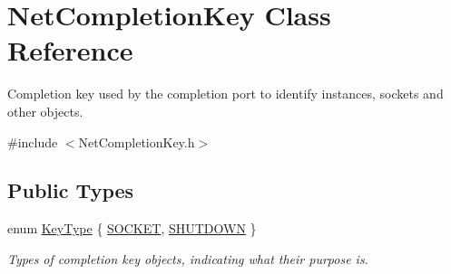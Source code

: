 \hypertarget{class_net_completion_key}{
\section{NetCompletionKey Class Reference}
\label{class_net_completion_key}
}


Completion key used by the completion port to identify instances, sockets and other objects.  




{\ttfamily \#include $<$NetCompletionKey.h$>$}

\subsection*{Public Types}
\begin{DoxyCompactItemize}
\item 
enum \hyperlink{class_net_completion_key_a129b5d89d5f2ac58abcc9872adc85d32}{KeyType} \{ \hyperlink{class_net_completion_key_a129b5d89d5f2ac58abcc9872adc85d32aa5938cb8a68c873ecec66e4440597891}{SOCKET}, 
\hyperlink{class_net_completion_key_a129b5d89d5f2ac58abcc9872adc85d32a6de0ac39e69b38d1e5b3d89f14168992}{SHUTDOWN}
 \}
\begin{DoxyCompactList}\small\item\em Types of completion key objects, indicating what their purpose is. \item\end{DoxyCompactList}\end{DoxyCompactItemize}
